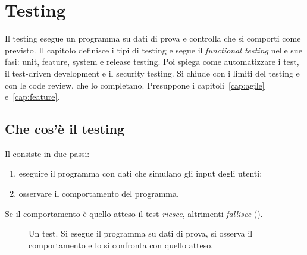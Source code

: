 \chapter{Testing}
\label{cap:testing}

\begin{inbreve}
Il testing esegue un programma su dati di prova e controlla che si comporti come previsto. Il capitolo definisce i
tipi di testing e segue il \emph{functional testing} nelle sue fasi: unit, feature, system e release testing. Poi
spiega come automatizzare i test, il test-driven development e il security testing. Si chiude con i limiti del testing
e con le code review, che lo completano. Presuppone i capitoli~\ref{cap:agile} e~\ref{cap:feature}.
\end{inbreve}

\section{Che cos'è il testing}
\label{sec:test-intro}

\begin{definizione}[Testing]
Il  consiste in due passi:
\begin{enumerate}
  \item eseguire il programma con dati che simulano gli input degli utenti;
  \item osservare il comportamento del programma.
\end{enumerate}
Se il comportamento è quello atteso il test \emph{riesce}, altrimenti \emph{fallisce} ().
\end{definizione}

\begin{figure}[ht]
\centering
{}
\caption{Un test. Si esegue il programma su dati di prova, si osserva il comportamento e lo si confronta con quello
atteso.}
\label{fig:test-ciclo}
\end{figure}

